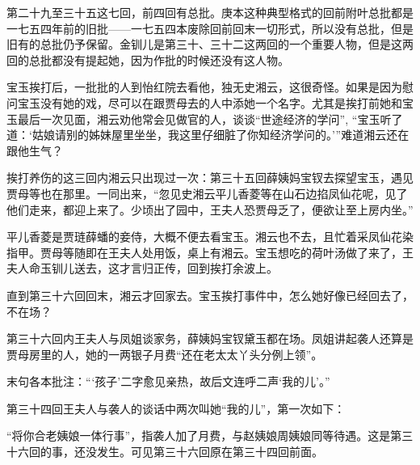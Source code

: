 \par 第二十九至三十五这七回，前四回有总批。庚本这种典型格式的回前附叶总批都是一七五四年前的旧批——一七五四本废除回前回末一切形式，所以没有总批，但是旧有的总批仍予保留。金钏儿是第三十、三十二这两回的一个重要人物，但是这两回的总批都没有提起她，因为作批的时候还没有这人物。
\par 宝玉挨打后，一批批的人到怡红院去看他，独无史湘云，这很奇怪。如果是因为慰问宝玉没有她的戏，尽可以在跟贾母去的人中添她一个名字。尤其是挨打前她和宝玉最后一次见面，湘云劝他常会见做官的人，谈谈“世途经济的学问”, “宝玉听了道：‘姑娘请别的姊妹屋里坐坐，我这里仔细脏了你知经济学问的。'”难道湘云还在跟他生气？
\par 挨打养伤的这三回内湘云只出现过一次：第三十五回薛姨妈宝钗去探望宝玉，遇见贾母等也在那里。一同出来，“忽见史湘云平儿香菱等在山石边掐凤仙花呢，见了他们走来，都迎上来了。少顷出了园中，王夫人恐贾母乏了，便欲让至上房内坐。”
\par 平儿香菱是贾琏薛蟠的妾侍，大概不便去看宝玉。湘云也不去，且忙着采凤仙花染指甲。贾母等随即在王夫人处用饭，桌上有湘云。宝玉想吃的荷叶汤做了来了，王夫人命玉钏儿送去，这才言归正传，回到挨打余波上。
\par 直到第三十六回回末，湘云才回家去。宝玉挨打事件中，怎么她好像已经回去了，不在场？
\par 第三十六回内王夫人与凤姐谈家务，薛姨妈宝钗黛玉都在场。凤姐讲起袭人还算是贾母房里的人，她的一两银子月费“还在老太太丫头分例上领”。
\par 末句各本批注：“‘孩子’二字愈见亲热，故后文连呼二声‘我的儿’。”
\par 第三十四回王夫人与袭人的谈话中两次叫她“我的儿”，第一次如下：
\par “将你合老姨娘一体行事”，指袭人加了月费，与赵姨娘周姨娘同等待遇。这是第三十六回的事，还没发生。可见第三十六回原在第三十四回前面。
